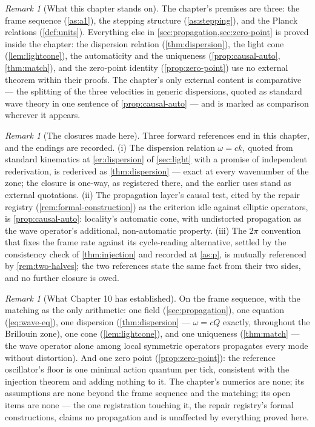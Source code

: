 \documentclass[11pt]{amsbook}
\theoremstyle{plain}
\theoremstyle{definition}
\theoremstyle{remark}
\newtheorem{remark}[theorem]{Remark}
\begin{document}
\begin{remark}[What this chapter stands on]\label{rem:ch10-premises}
The chapter's premises are three: the frame sequence (\cref{as:a1}), the stepping structure (\cref{as:stepping}), and the Planck relations (\cref{def:units}). Everything else in \cref{sec:propagation,sec:zero-point} is proved inside the chapter: the dispersion relation (\cref{thm:dispersion}), the light cone (\cref{lem:lightcone}), the automaticity and the uniqueness (\cref{prop:causal-auto}, \cref{thm:match}), and the zero-point identity (\cref{prop:zero-point}) use no external theorem within their proofs. The chapter's only external content is comparative --- the splitting of the three velocities in generic dispersions, quoted as standard wave theory in one sentence of \cref{prop:causal-auto} --- and is marked as comparison wherever it appears.
\end{remark}

\begin{remark}[The closures made here]\label{rem:ch10-closures}
Three forward references end in this chapter, and the endings are recorded. (i) The dispersion relation $\omega = ck$, quoted from standard kinematics at \cref{er:dispersion} of \cref{sec:light} with a promise of independent rederivation, is rederived as \cref{thm:dispersion} --- exact at every wavenumber of the zone; the closure is one-way, as registered there, and the earlier uses stand as external quotations. (ii) The propagation layer's causal test, cited by the repair registry (\cref{rem:formal-construction}) as the criterion idle against elliptic operators, is \cref{prop:causal-auto}: locality's automatic cone, with undistorted propagation as the wave operator's additional, non-automatic property. (iii) The $2\pi$ convention that fixes the frame rate against its cycle-reading alternative, settled by the consistency check of \cref{thm:injection} and recorded at \cref{as:p}, is mutually referenced by \cref{rem:two-halves}; the two references state the same fact from their two sides, and no further closure is owed.
\end{remark}

\begin{remark}[What Chapter 10 has established]\label{rem:ch10summary}
On the frame sequence, with the matching as the only arithmetic: one field (\cref{sec:propagation}), one equation (\cref{eq:wave-eq}), one dispersion (\cref{thm:dispersion} --- $\omega = cQ$ exactly, throughout the Brillouin zone), one cone (\cref{lem:lightcone}), and one uniqueness (\cref{thm:match} --- the wave operator alone among local symmetric operators propagates every mode without distortion). And one zero point (\cref{prop:zero-point}): the reference oscillator's floor is one minimal action quantum per tick, consistent with the injection theorem and adding nothing to it. The chapter's numerics are none; its assumptions are none beyond the frame sequence and the matching; its open items are none --- the one registration touching it, the repair registry's formal constructions, claims no propagation and is unaffected by everything proved here.
\end{remark}
\end{document}
